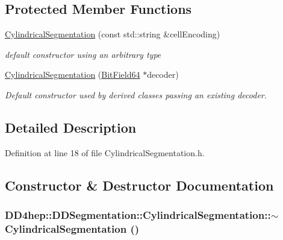 \subsection*{Protected Member Functions}
\begin{DoxyCompactItemize}
\item 
\hyperlink{class_d_d4hep_1_1_d_d_segmentation_1_1_cylindrical_segmentation_afe34b42dad91d1b2fc50d21ecae094fe}{CylindricalSegmentation} (const std::string \&cellEncoding)
\begin{DoxyCompactList}\small\item\em default constructor using an arbitrary type \item\end{DoxyCompactList}\item 
\hyperlink{class_d_d4hep_1_1_d_d_segmentation_1_1_cylindrical_segmentation_ab523036ee9a48b8a7046c99b12cc8401}{CylindricalSegmentation} (\hyperlink{class_d_d4hep_1_1_d_d_segmentation_1_1_bit_field64}{BitField64} $\ast$decoder)
\begin{DoxyCompactList}\small\item\em Default constructor used by derived classes passing an existing decoder. \item\end{DoxyCompactList}\end{DoxyCompactItemize}


\subsection{Detailed Description}


Definition at line 18 of file CylindricalSegmentation.h.

\subsection{Constructor \& Destructor Documentation}
\hypertarget{class_d_d4hep_1_1_d_d_segmentation_1_1_cylindrical_segmentation_a7f069ce1b0c511e208a847ad3e5ddef7}{
\subsubsection[{$\sim$CylindricalSegmentation}]{\setlength{\rightskip}{0pt plus 5cm}DD4hep::DDSegmentation::CylindricalSegmentation::$\sim$CylindricalSegmentation ()}}
\label{class_d_d4hep_1_1_d_d_segmentation_1_1_cylindrical_segmentation_a7f069ce1b0c511e208a847ad3e5ddef7}


